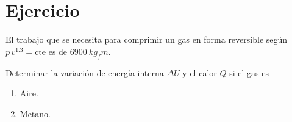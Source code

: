 \section{Ejercicio}\label{ej:Chap05Ejercicio02}
El trabajo que se necesita para comprimir un gas en forma reversible según $p\,v^{1.3}=\text{cte}$ es de $\SI{6900}{kg_fm}$.

Determinar la variación de energía interna $\Delta U$ y el calor $Q$ si el gas es
\begin{enumerate}
    \item Aire.
    \item Metano.
\end{enumerate}